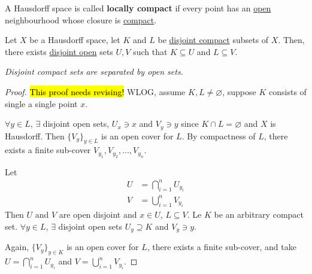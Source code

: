 \documentclass[11pt]{article}
\begin{document}
	\begin{definition}
		A Hausdorff space is called \textbf{locally compact} if every point has an \ul{open} neighbourhood whose closure is \ul{compact}.
	\end{definition}
	
	\begin{lemma}
		Let $X$ be a Hausdorff space, let $K$ and $L$ be \ul{disjoint compact} subsets of $X$.
		Then, there exists \ul{disjoint open} sets $U, V$ such that $K \subseteq U$ and $L \subseteq V$.
		
		\emph{Disjoint compact sets are separated by open sets.}
		\begin{proof}
			\hl{This proof needs revising!}
			WLOG, assume $K, L \neq \varnothing$, suppose $K$ consists of single a single point $x$.
			
			$\forall y \in L$, $\exists$ disjoint open sets, $U_x \ni x$ and $V_y \ni y$ since $K \cap L = \varnothing$ and $X$ is Hausdorff. Then $\{V_y\}_{y \in L}$ is an open cover for $L$. By compactness of $L$, there exists a finite sub-cover $V_{y_1}, V_{y_2}, \dots, V_{y_n}$.
			
			Let 
			\begin{align}
				U &= \bigcap_{i=1}^n U_{y_i} \\
				V &= \bigcup_{i=1}^n V_{y_i}
			\end{align}
			Then $U$ and $V$ are open disjoint and $x \in U$, $L \subseteq V$.
			Le $K$ be an arbitrary compact set. $\forall y \in L$, $\exists$ disjoint open sets $U_y \supseteq K$ and $V_y \ni y$.
			
			Again, $\{V_y\}_{y \in K}$ is an open cover for $L$, there exists a finite sub-cover, and take $U = \bigcap_{i=1}^n U_{y_i}$ and $V = \bigcup_{i=1}^n V_{y_i}$.
		\end{proof}
	\end{lemma}
	
\end{document}
